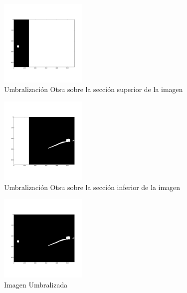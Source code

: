 \documentclass[journal]{IEEEtran}
\begin{document}
\begin{figure}[ht]
\begin{center}
\includegraphics[width=0.37\textwidth]{resultados/Coral_3_S3_square_otsu} %
\caption{Umbralización Otsu sobre la sección superior de la imagen}
\label{fg:square_otsu}
\end{center}
\end{figure}
\FloatBarrier

\begin{figure}[ht]
\begin{center}
\includegraphics[width=0.37\textwidth]{resultados/Coral_3_S3_coral_otsu} %
\caption{Umbralización Otsu sobre la sección inferior de la imagen}
\label{fg:coral_otsu}
\end{center}
\end{figure}
\FloatBarrier


\begin{figure}[ht]
\begin{center}
\includegraphics[width=0.37\textwidth]{resultados/Coral_3_S3_thresholded} %
\caption{Imagen Umbralizada}
\label{fg:umbral}
\end{center}
\end{figure}
\FloatBarrier
\end{document}
